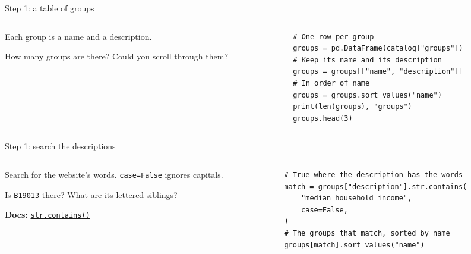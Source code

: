 \documentclass[9pt,aspectratio=169]{beamer}
\begin{document}
\begin{frame}[fragile]{Step 1: a table of groups}
    \begin{columns}[T]
        \begin{column}{0.37\textwidth}
            Each group is a name and a description.

            \medskip
            How many groups are there? Could you scroll through them?
        \end{column}
        \begin{column}{0.6\textwidth}
\begin{lstlisting}
# One row per group
groups = pd.DataFrame(catalog["groups"])
# Keep its name and its description
groups = groups[["name", "description"]]
# In order of name
groups = groups.sort_values("name")
print(len(groups), "groups")
groups.head(3)
\end{lstlisting}
        \end{column}
    \end{columns}
\end{frame}

\begin{frame}[fragile]{Step 1: search the descriptions}
    \begin{columns}[T]
        \begin{column}{0.37\textwidth}
            Search for the website's words. \texttt{case=False} ignores capitals.

            \medskip
            Is \texttt{B19013} there? What are its lettered siblings?

            \medskip
            {\scriptsize\textbf{Docs:} \href{https://pandas.pydata.org/docs/reference/api/pandas.Series.str.contains.html}{\texttt{str.contains()}}\par}
        \end{column}
        \begin{column}{0.6\textwidth}
\begin{lstlisting}
# True where the description has the words
match = groups["description"].str.contains(
    "median household income",
    case=False,
)
# The groups that match, sorted by name
groups[match].sort_values("name")
\end{lstlisting}
        \end{column}
    \end{columns}
\end{frame}
\end{document}
